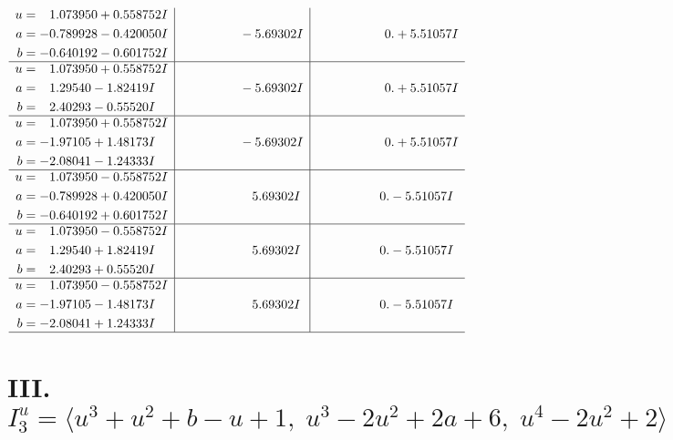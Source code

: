 \documentclass[1p]{elsarticle_modified}
\theoremstyle{definition}
\begin{document}
$$\begin{array}{c|c|c}
\begin{aligned}
u &= \phantom{-}1.073950 + 0.558752 I \\
a &= -0.789928 - 0.420050 I \\
b &= -0.640192 - 0.601752 I\end{aligned}
 & \phantom{-0.000000 } -5.69302 I & \phantom{-0.000000 -}0. + 5.51057 I \\ \hline\begin{aligned}
u &= \phantom{-}1.073950 + 0.558752 I \\
a &= \phantom{-}1.29540 - 1.82419 I \\
b &= \phantom{-}2.40293 - 0.55520 I\end{aligned}
 & \phantom{-0.000000 } -5.69302 I & \phantom{-0.000000 -}0. + 5.51057 I \\ \hline\begin{aligned}
u &= \phantom{-}1.073950 + 0.558752 I \\
a &= -1.97105 + 1.48173 I \\
b &= -2.08041 - 1.24333 I\end{aligned}
 & \phantom{-0.000000 } -5.69302 I & \phantom{-0.000000 -}0. + 5.51057 I \\ \hline\begin{aligned}
u &= \phantom{-}1.073950 - 0.558752 I \\
a &= -0.789928 + 0.420050 I \\
b &= -0.640192 + 0.601752 I\end{aligned}
 & \phantom{-0.000000 -}5.69302 I & \phantom{-0.000000 } 0. - 5.51057 I \\ \hline\begin{aligned}
u &= \phantom{-}1.073950 - 0.558752 I \\
a &= \phantom{-}1.29540 + 1.82419 I \\
b &= \phantom{-}2.40293 + 0.55520 I\end{aligned}
 & \phantom{-0.000000 -}5.69302 I & \phantom{-0.000000 } 0. - 5.51057 I \\ \hline\begin{aligned}
u &= \phantom{-}1.073950 - 0.558752 I \\
a &= -1.97105 - 1.48173 I \\
b &= -2.08041 + 1.24333 I\end{aligned}
 & \phantom{-0.000000 -}5.69302 I & \phantom{-0.000000 } 0. - 5.51057 I\\
 \hline 
 \end{array}$$\newpage\newpage\renewcommand{\arraystretch}{1}
\centering \section*{III. $I^u_{3}= \langle u^3+u^2+b- u+1,\;u^3-2 u^2+2 a+6,\;u^4-2 u^2+2 \rangle$}
\end{document}
